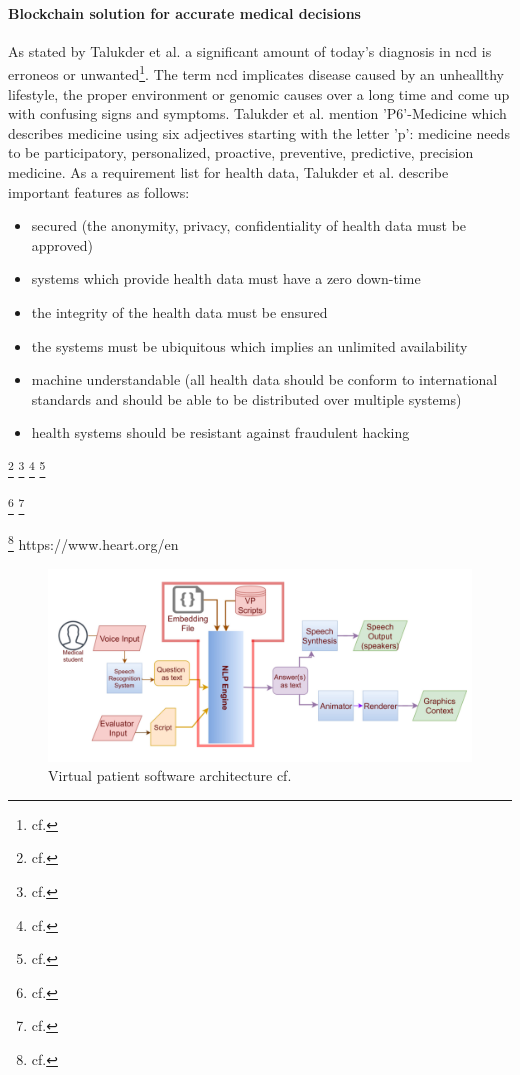 \paragraph{Blockchain solution for accurate medical decisions}
As stated by Talukder et al. a significant amount of today's diagnosis in \ac{ncd} is erroneos or unwanted\footnote{cf.\autocite{talukder}}. The term \ac{ncd} implicates disease caused by an unheallthy lifestyle, the proper environment or genomic causes over a long time and come up with confusing signs and symptoms.
Talukder et al. mention 'P6'-Medicine which describes medicine using six adjectives starting with the letter 'p': medicine needs to be participatory, personalized, proactive, preventive, predictive, precision medicine.
As a requirement list for health data, Talukder et al. describe important features as follows: 

\begin{itemize}
  \item secured (the anonymity, privacy, confidentiality of health data must be approved)
  \item systems which provide health data must have a zero down-time 
  \item the integrity of the health data must be ensured
  \item the systems must be ubiquitous which implies an unlimited availability
  \item machine understandable (all health data should be conform to international standards and should be able to be distributed over multiple systems)
  \item health systems should be resistant against fraudulent hacking
\end{itemize}






\footnote{cf.\autocite{akhtar}}
\footnote{cf.\autocite{kawohl}}
\footnote{cf.\autocite{zini}}
\footnote{cf.\autocite{zimmermann}}

\footnote{cf.\autocite{white_blood_2007}}
\footnote{cf.\autocite{beevers_blood_2001}}

\footnote{cf.\autocite{alessa}}
https://www.heart.org/en

\begin{figure}[htbp]
	\centering
	\includegraphics[width=1\textwidth]{images/vp_architecture.png}
	\caption{Virtual patient software architecture cf.\autocite{zini}}
	\label{vp_architecture}
\end{figure}

